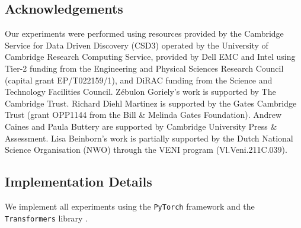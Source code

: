 

\subsection*{Acknowledgements}

Our experiments were performed using resources provided by the Cambridge Service for Data Driven Discovery (CSD3) operated by the University of Cambridge Research Computing Service, provided by Dell EMC and Intel using Tier-2 funding from the Engineering and Physical Sciences Research Council (capital grant EP/T022159/1), and DiRAC funding from the Science and Technology Facilities Council. Z\'ebulon Goriely's work is supported by The Cambridge Trust. Richard Diehl Martinez is supported by the Gates Cambridge Trust (grant OPP1144 from the Bill \& Melinda Gates Foundation). Andrew Caines and Paula Buttery are supported by Cambridge University Press \& Assessment. 
Lisa Beinborn's work is partially supported by the Dutch National Science Organisation (NWO) through the VENI program (Vl.Veni.211C.039).

%

%

\newpage


\subsection{Implementation Details}\label{app:implementation_details}

We implement all experiments using the \texttt{PyTorch} framework \citep{paszke-etal-2019-pytorch} and the \texttt{Transformers} library \citep{wolf-etal-2020-transformers}.

